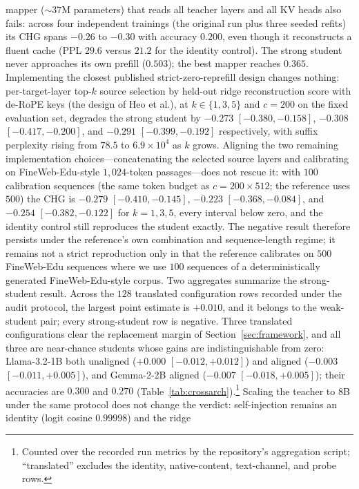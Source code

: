 \documentclass[10pt]{article}
\begin{document}
mapper ($\sim$$37$M parameters) that reads all teacher layers and all KV heads
also fails: across four independent trainings (the original run plus three
seeded refits) its CHG spans $-0.26$ to $-0.30$ with accuracy $0.200$, even
though it reconstructs a fluent cache (PPL $29.6$
versus $21.2$ for the identity control). The strong student never
approaches its own prefill ($0.503$); the best mapper reaches $0.365$.
Implementing the closest published strict-zero-reprefill design changes nothing:
per-target-layer top-$k$ source selection by held-out ridge reconstruction score
with de-RoPE keys (the design of Heo et al.), at $k\in\{1,3,5\}$ and $c{=}200$
on the fixed evaluation set, degrades the strong student by $-0.273$
$[-0.380,-0.158]$, $-0.308$ $[-0.417,-0.200]$, and $-0.291$
$[-0.399,-0.192]$ respectively, with suffix perplexity rising from $78.5$ to
$6.9\times10^{4}$ as $k$ grows. Aligning the two remaining implementation choices---concatenating the selected source layers and calibrating on FineWeb-Edu-style $1{,}024$-token passages---does not rescue it: with $100$ calibration sequences (the same token budget as $c{=}200\times512$; the reference uses $500$) the CHG is $-0.279$ $[-0.410,-0.145]$, $-0.223$ $[-0.368,-0.084]$, and $-0.254$ $[-0.382,-0.122]$ for $k{=}1,3,5$, every interval below zero, and the identity control still reproduces the student exactly. The negative result therefore persists under the reference's own combination and sequence-length regime; it remains not a strict reproduction only in that the reference calibrates on $500$ FineWeb-Edu sequences where we use $100$ sequences of a deterministically generated FineWeb-Edu-style corpus. Two
aggregates summarize the strong-student result. Across the $128$ translated configuration
rows recorded under the audit protocol, the largest point estimate is $+0.010$,
and it belongs to the weak-student pair; every strong-student row is negative.
Three translated configurations clear the replacement margin of
Section~\ref{sec:framework}, and all three are near-chance students whose gains
are indistinguishable from zero: Llama-3.2-1B both unaligned ($+0.000$
$[-0.012, +0.012]$) and aligned ($-0.003$ $[-0.011, +0.005]$), and Gemma-2-2B
aligned ($-0.007$ $[-0.018, +0.005]$); their accuracies are $0.300$ and $0.270$
(Table~\ref{tab:crossarch}).\footnote{Counted over the recorded run metrics by the repository's
aggregation script; ``translated'' excludes the identity, native-content,
text-channel, and probe rows.} Scaling
the teacher to 8B under the same protocol does not change the verdict:
self-injection remains an identity (logit cosine $0.99998$) and the ridge
$$
\end{document}
